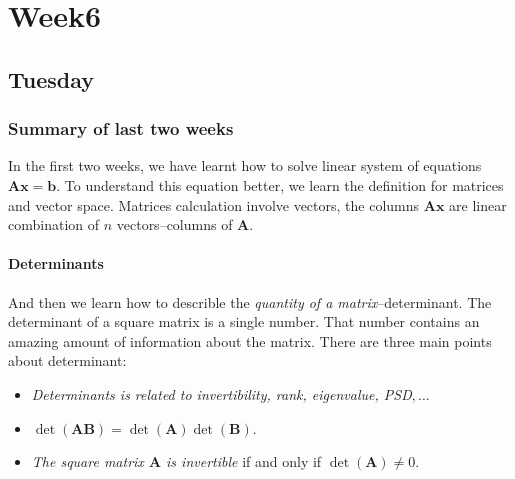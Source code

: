 
\chapter{Week6}

\section{Tuesday}
\subsection{Summary of last two weeks}
In the first two weeks, we have learnt how to solve linear system of equations $\bm{Ax}=\bm b$. To understand this equation better, we learn the definition for matrices and vector space. Matrices calculation involve vectors, the columns $\bm{Ax}$ are linear combination of $n$ vectors--columns of $\bm{A}$. \\
\subsubsection{Determinants}
And then we learn how to describle the \emph{quantity of a matrix}--determinant. The determinant of a square matrix is a single number. That number contains an amazing amount of information about the matrix. There are three main points about determinant:
\begin{itemize}
\item
\textit{Determinants is related to invertibility, rank, eigenvalue, PSD$,\dots$}
\item
$\det(\bm{AB})=\det(\bm A)\det(\bm B).$
\item
\textit{The square matrix $\bm A$ is invertible} if and only if $\det(\bm A)\ne 0.$
\end{itemize}


